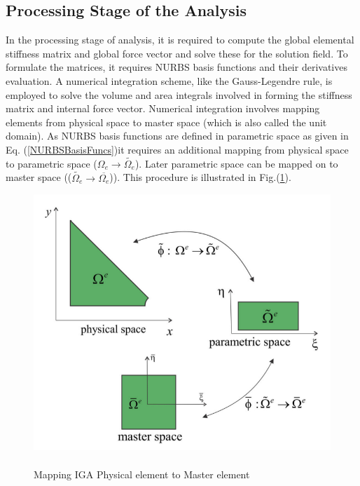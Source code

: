 \documentclass[11pt]{article}
\begin{document}
\subsection{Processing Stage of the Analysis} \label{ProcessingStage}
In the processing stage of analysis, it is required to compute the global elemental stiffness matrix and global force vector and solve these for the solution field. To formulate the matrices, it requires NURBS basis functions and their derivatives evaluation. A numerical integration scheme, like the Gauss-Legendre rule, is employed to solve the volume and area integrals involved in forming the stiffness matrix and internal force vector. Numerical integration involves mapping elements from physical space to master space (which is also called the unit domain). As NURBS basis functions are defined in parametric space as given in Eq. (\ref{NURBSBasisFuncs})it requires an additional mapping from physical space to parametric space ($\Omega_e \rightarrow \widetilde{\Omega_e}$). Later parametric space can be mapped on to master space (($\widetilde{\Omega_e} \rightarrow \overline{\Omega_e}$)). This procedure is illustrated in Fig.(\ref{MasterPhysical}).
\begin{figure}[H]
	\begin{center}
		\includegraphics[scale=0.3]{Physical_Master.png} 
		\caption{\\Mapping IGA Physical element to Master
			element \cite{agrawal2019iga}}\label{MasterPhysical}
	\end{center}	
\end{figure}
\end{document}
